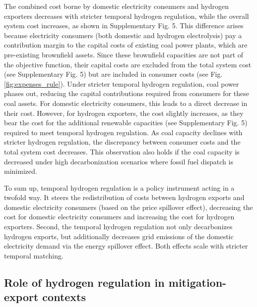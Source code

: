 \documentclass[5p,numafflabel]{elsarticle}
\newcommand{\co}{\ce{CO2}~}
\def\co{CO${}_2${\:}}
\begin{document}
The combined cost borne by domestic electricity consumers and hydrogen exporters decreases with stricter temporal hydrogen regulation, while the overall system cost increases, as shown in Supplementary Fig. 5. %
This difference arises because electricity consumers (both domestic and hydrogen electrolysis) pay a contribution margin to the capital costs of existing coal power plants, which are pre-existing brownfield assets. Since these brownfield capacities are not part of the objective function, their capital costs are excluded from the total system cost (see Supplementary Fig. 5) but are included in consumer costs (see Fig. \ref{fig:expenses_rule}). %
Under stricter temporal hydrogen regulation, coal power phases out, reducing the capital contributions required from consumers for these coal assets. For domestic electricity consumers, this leads to a direct decrease in their cost. However, for hydrogen exporters, the cost slightly increases, as they bear the cost for the additional renewable capacities (see Supplementary Fig. 5) required to meet temporal hydrogen regulation. %
As coal capacity declines with stricter hydrogen regulation, the discrepancy between consumer costs and the total system cost decreases. This observation also holds if the coal capacity is decreased under high decarbonization scenarios where fossil fuel dispatch is minimized.



To sum up, temporal hydrogen regulation is a policy instrument acting in a twofold way. It steers the redistribution of costs between hydrogen exports and domestic electricity consumers (based on the price spillover effect), decreasing the cost for domestic electricity consumers and increasing the cost for hydrogen exporters. 
Second, the temporal hydrogen regulation 
not only decarbonizes hydrogen exports, but additionally decreases grid emissions of the domestic electricity demand via the energy spillover effect. Both effects scale with stricter temporal matching.



\subsection*{Role of hydrogen regulation in mitigation-export contexts}
\label{subsec:rule_all}
\end{document}
